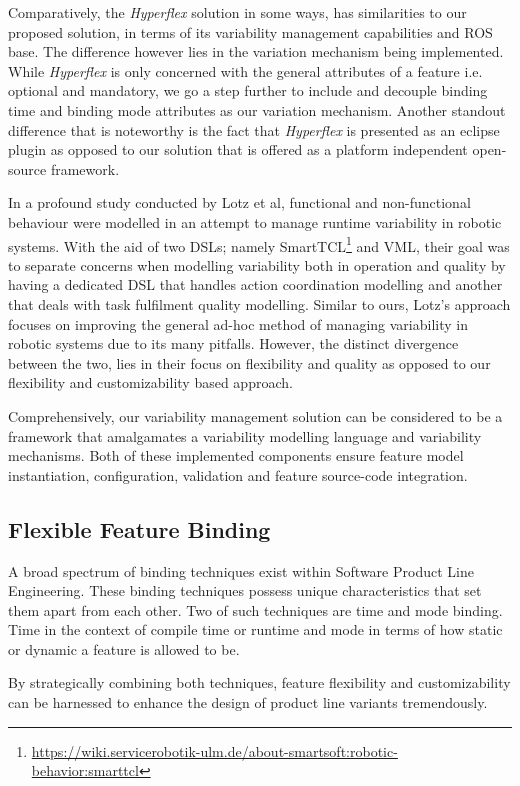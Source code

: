 \documentclass[conference]{IEEEtran}
\newcommand{\foot}[1]{\footnote{\url{#1}}}
\begin{document}
Comparatively, the \textit{Hyperflex} solution in some ways, has similarities to our proposed solution, in terms of its variability management capabilities and ROS base. The difference however lies in the variation mechanism being implemented. While \textit{Hyperflex} is only concerned with the general attributes of a feature i.e. optional and mandatory, we go a step further to include and decouple binding time and binding mode attributes as our variation mechanism. Another standout difference that is noteworthy is the fact that \textit{Hyperflex} is presented as an eclipse plugin as opposed to our solution that is offered as a platform independent open-source framework.

In a profound study conducted by Lotz et al\cite{man-runt-var-lotz}, functional and non-functional behaviour were modelled in an attempt to manage runtime variability in robotic systems. With the aid of two DSLs; namely SmartTCL\foot{https://wiki.servicerobotik-ulm.de/about-smartsoft:robotic-behavior:smarttcl} and VML\cite{vml}, their goal was to separate concerns when modelling variability both in operation and quality by having a dedicated DSL that handles action coordination modelling and another that deals with task fulfilment quality modelling. Similar to ours, Lotz's approach focuses on improving the general ad-hoc method of managing variability in robotic systems due to its many pitfalls. However, the distinct divergence between the two, lies in their focus on flexibility and quality as opposed to our flexibility and customizability based approach.

Comprehensively, our variability management solution can be considered to be a framework that amalgamates a variability modelling language and variability mechanisms. Both of these implemented components ensure feature model instantiation, configuration, validation and feature source-code integration.

\subsection{Flexible Feature Binding}
A broad spectrum of binding techniques exist within Software Product Line Engineering. These binding techniques possess unique characteristics that set them apart from each other. Two of such techniques are time and mode binding. Time in the context of compile time or runtime and mode in terms of how static or dynamic a feature is allowed to be. 

By strategically combining both techniques, feature flexibility and customizability can be harnessed to enhance the design of product line variants tremendously.
\end{document}
